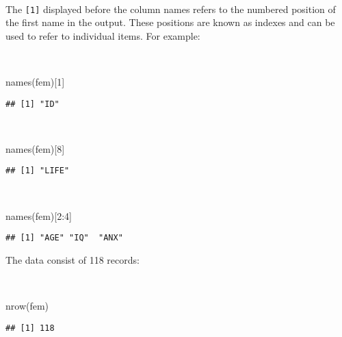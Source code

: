 \documentclass[
  12pt,
  a4paper]{book}
\newenvironment{Shaded}{\begin{snugshade}}{\end{snugshade}}
\newcommand{\DecValTok}[1]{\textcolor[rgb]{0.00,0.00,0.81}{#1}}
\newcommand{\FunctionTok}[1]{\textcolor[rgb]{0.00,0.00,0.00}{#1}}
\newcommand{\NormalTok}[1]{#1}
\newcommand{\SpecialCharTok}[1]{\textcolor[rgb]{0.00,0.00,0.00}{#1}}
\begin{document}
~

The \texttt{{[}1{]}} displayed before the column names refers to the numbered position of the first name in the output. These positions are known as indexes and can be used to refer to individual items. For example:

~

\begin{Shaded}
\begin{Highlighting}[]
\FunctionTok{names}\NormalTok{(fem)[}\DecValTok{1}\NormalTok{]}
\end{Highlighting}
\end{Shaded}

\begin{verbatim}
## [1] "ID"
\end{verbatim}

~

\begin{Shaded}
\begin{Highlighting}[]
\FunctionTok{names}\NormalTok{(fem)[}\DecValTok{8}\NormalTok{]}
\end{Highlighting}
\end{Shaded}

\begin{verbatim}
## [1] "LIFE"
\end{verbatim}

~

\begin{Shaded}
\begin{Highlighting}[]
\FunctionTok{names}\NormalTok{(fem)[}\DecValTok{2}\SpecialCharTok{:}\DecValTok{4}\NormalTok{]}
\end{Highlighting}
\end{Shaded}

\begin{verbatim}
## [1] "AGE" "IQ"  "ANX"
\end{verbatim}

\newpage

The data consist of 118 records:

~

\begin{Shaded}
\begin{Highlighting}[]
\FunctionTok{nrow}\NormalTok{(fem)}
\end{Highlighting}
\end{Shaded}

\begin{verbatim}
## [1] 118
\end{verbatim}
\end{document}
